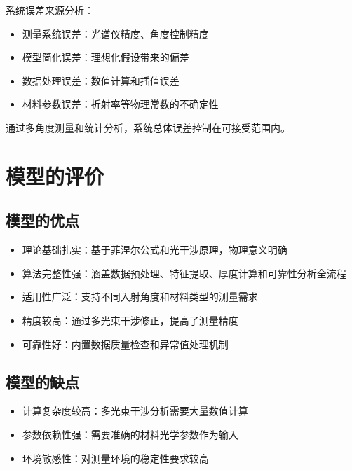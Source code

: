 \documentclass[withoutpreface,bwprint]{cumcmthesis}
\begin{document}
系统误差来源分析：
\begin{itemize}[itemindent=2em]
\item 测量系统误差：光谱仪精度、角度控制精度
\item 模型简化误差：理想化假设带来的偏差
\item 数据处理误差：数值计算和插值误差
\item 材料参数误差：折射率等物理常数的不确定性
\end{itemize}

通过多角度测量和统计分析，系统总体误差控制在可接受范围内。


\section{模型的评价}

\subsection{模型的优点}
\begin{itemize}[itemindent=2em]
\item 理论基础扎实：基于菲涅尔公式和光干涉原理，物理意义明确
\item 算法完整性强：涵盖数据预处理、特征提取、厚度计算和可靠性分析全流程
\item 适用性广泛：支持不同入射角度和材料类型的测量需求
\item 精度较高：通过多光束干涉修正，提高了测量精度
\item 可靠性好：内置数据质量检查和异常值处理机制
\end{itemize}

\subsection{模型的缺点}
\begin{itemize}[itemindent=2em]
\item 计算复杂度较高：多光束干涉分析需要大量数值计算
\item 参数依赖性强：需要准确的材料光学参数作为输入
\item 环境敏感性：对测量环境的稳定性要求较高
\end{itemize}

\nocite{*}
\end{document}
